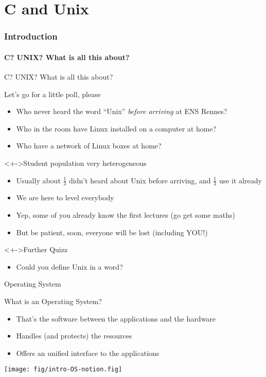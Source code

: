 \part{C and Unix}\toc
\section{Introduction}
\subsection{C? UNIX? What is all this about?}
\begin{frame}{C? UNIX? What is all this about?}
  \begin{block}{Let's go for a little poll, please}
    \begin{itemize}
    \item<+-> Who never heard the word ``Unix'' \textit{before arriving} at
      ENS Rennes?
    \item<+-> Who in the room have Linux installed on a computer at home?
    \item<+-> Who have a network of Linux boxes at home?
    \end{itemize}
  \end{block}

  \begin{block}<+->{Student population very heterogeneous}
    \begin{itemize}
    \item Usually about $\frac{1}{3}$ didn't heard about Unix before arriving,
      and $\frac{1}{3}$ use it already
    \item We are here to level everybody
    \item Yep, some of you already know the first lectures
      {\small(go get some maths)}
    \item But be patient, soon, everyone will be lost (including YOU!)
    \end{itemize}
  \end{block}

  \begin{block}<+->{Further Quizz}
    \begin{itemize}
    \item Could you define Unix in a word? 
    \end{itemize}
  \end{block}
\end{frame}
\begin{frame}{Operating System}
  \begin{block}{What is an Operating System?}
    \begin{itemize}
    \item That's the software between the applications and the hardware
    \item Handles (and protects) the resources
    \item Offers an unified interface to the applications
    \end{itemize}
  \end{block}
  \centerline{\texttt{[image: fig/intro-OS-notion.fig]}}
\end{frame}
